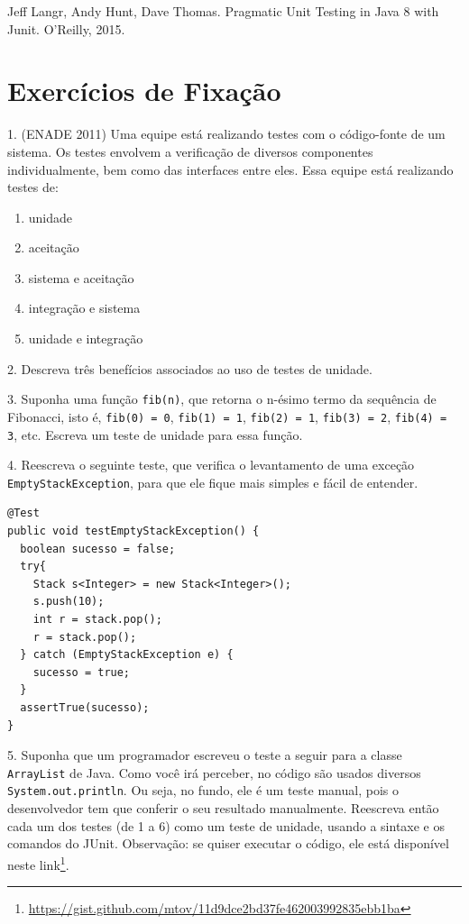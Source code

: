 \documentclass[
  11pt,
  twoside]{book}
\newcommand{\passthrough}[1]{#1}
\DeclareRobustCommand{\href}[2]{#2\footnote{\url{#1}}}
\providecommand{\tightlist}{%
  \setlength{\itemsep}{0pt}\setlength{\parskip}{0pt}}
\begin{document}
Jeff Langr, Andy Hunt, Dave Thomas. Pragmatic Unit Testing in Java 8
with Junit. O'Reilly, 2015.

\hypertarget{exercuxedcios-de-fixauxe7uxe3o-7}{%
\section*{Exercícios de
Fixação}\label{exercuxedcios-de-fixauxe7uxe3o-7}}

1. (ENADE 2011) Uma equipe está realizando testes com o código-fonte de
um sistema. Os testes envolvem a verificação de diversos componentes
individualmente, bem como das interfaces entre eles. Essa equipe está
realizando testes de:

\begin{enumerate}
\def\labelenumi{(\alph{enumi})}
\tightlist
\item
  unidade
\item
  aceitação
\item
  sistema e aceitação
\item
  integração e sistema
\item
  unidade e integração
\end{enumerate}

2. Descreva três benefícios associados ao uso de testes de unidade.

3. Suponha uma função \passthrough{\lstinline!fib(n)!}, que retorna o
n-ésimo termo da sequência de Fibonacci, isto é,
\passthrough{\lstinline!fib(0) = 0!},
\passthrough{\lstinline!fib(1) = 1!},
\passthrough{\lstinline!fib(2) = 1!},
\passthrough{\lstinline!fib(3) = 2!},
\passthrough{\lstinline!fib(4) = 3!}, etc. Escreva um teste de unidade
para essa função.

4. Reescreva o seguinte teste, que verifica o levantamento de uma
exceção \passthrough{\lstinline!EmptyStackException!}, para que ele
fique mais simples e fácil de entender.

\begin{lstlisting}
@Test
public void testEmptyStackException() {
  boolean sucesso = false;
  try{
    Stack s<Integer> = new Stack<Integer>();
    s.push(10);
    int r = stack.pop();
    r = stack.pop();
  } catch (EmptyStackException e) {
    sucesso = true;
  }
  assertTrue(sucesso);
}
\end{lstlisting}

5. Suponha que um programador escreveu o teste a seguir para a classe
\passthrough{\lstinline!ArrayList!} de Java. Como você irá perceber, no
código são usados diversos \passthrough{\lstinline!System.out.println!}.
Ou seja, no fundo, ele é um teste manual, pois o desenvolvedor tem que
conferir o seu resultado manualmente. Reescreva então cada um dos testes
(de 1 a 6) como um teste de unidade, usando a sintaxe e os comandos do
JUnit. Observação: se quiser executar o código, ele está disponível
neste
\href{https://gist.github.com/mtov/11d9dce2bd37fe462003992835ebb1ba}{link}.
\end{document}

